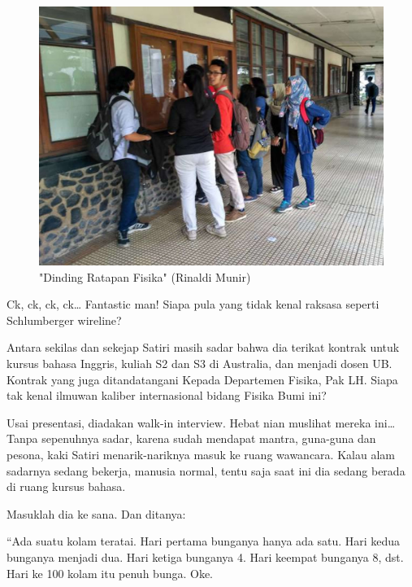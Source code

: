 \begin{figure}[htbp]
\centerline{\includegraphics[scale=0.2]{01-11-02}}
\caption{"Dinding Ratapan Fisika" (Rinaldi Munir)}
\label{01-11-02}
\end{figure}
%

Ck, ck, ck, ck… Fantastic man! Siapa pula yang tidak kenal raksasa seperti Schlumberger wireline?

Antara sekilas dan sekejap Satiri masih sadar bahwa dia terikat kontrak untuk kursus bahasa Inggris, kuliah S2 dan S3 di Australia, dan menjadi dosen UB. Kontrak yang juga ditandatangani Kepada Departemen Fisika, Pak LH. Siapa tak kenal ilmuwan kaliber internasional bidang Fisika Bumi ini?

Usai presentasi, diadakan walk-in interview. Hebat nian muslihat mereka ini… Tanpa sepenuhnya sadar, karena sudah mendapat mantra, guna-guna dan pesona, kaki Satiri menarik-nariknya masuk ke ruang wawancara. Kalau alam sadarnya sedang bekerja, manusia normal, tentu saja saat ini dia sedang berada di ruang kursus bahasa.

Masuklah dia ke sana. Dan ditanya:

“Ada suatu kolam teratai. Hari pertama bunganya hanya ada satu. Hari kedua bunganya menjadi dua. Hari ketiga bunganya 4. Hari keempat bunganya 8, dst. Hari ke 100 kolam itu penuh bunga. Oke.

